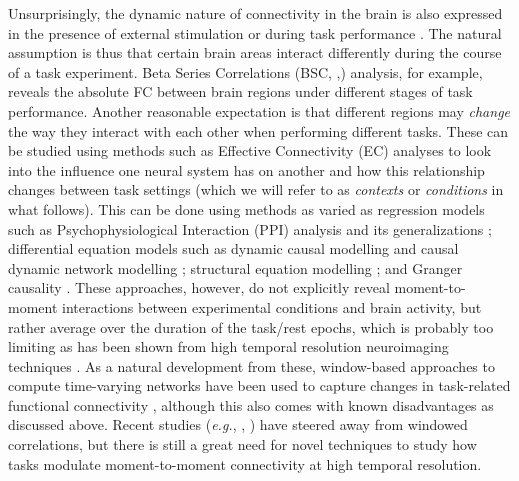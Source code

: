 Unsurprisingly, the dynamic nature of connectivity in the brain is also expressed in the presence of external stimulation or during task performance \citep{Gonzalez-Castillo2018}. The natural assumption is thus that certain brain areas interact differently during the course of a task experiment. Beta Series Correlations (BSC, \citeauthor{Rissman2004},\citeyear{Rissman2004}) analysis, for example, reveals the absolute FC between brain regions under different stages of task performance. Another reasonable expectation is that different regions may \textit{change} the way they interact with each other when performing different tasks. These can be studied using methods such as Effective Connectivity (EC) analyses to look into the influence one neural system has on another and how this relationship changes between task settings (which we will refer to as \textit{contexts} or \textit{conditions} in what follows). This can be done using methods as varied as regression models such as Psychophysiological Interaction (PPI) analysis \citep{Friston1997} and its generalizations \citep{McLaren2012}; differential equation models such as dynamic causal modelling \citep{Friston2003} and causal dynamic network modelling \citep{Cao2019};  structural equation modelling \citep{Zhuang2008}; and Granger causality \citep{Wen2013}. These approaches, however, do not explicitly reveal moment-to-moment interactions between experimental conditions and brain activity, but rather average over the duration of the task/rest epochs, which is probably too limiting as has been shown from high temporal resolution neuroimaging techniques \citep{Ploner2009, Zhang2012}. As a natural development from these, window-based approaches to compute time-varying networks have been used to capture changes in task-related functional connectivity \citep{Di2015,Baczkowski2017, Ge2019}, although this also comes with known disadvantages as discussed above. Recent studies (\textit{e.g.}, \citeauthor{Fransson2018}, \citeyear{Fransson2018}) have steered away from windowed correlations, but there is still a great need for novel techniques to study how tasks modulate moment-to-moment connectivity at high temporal resolution.


